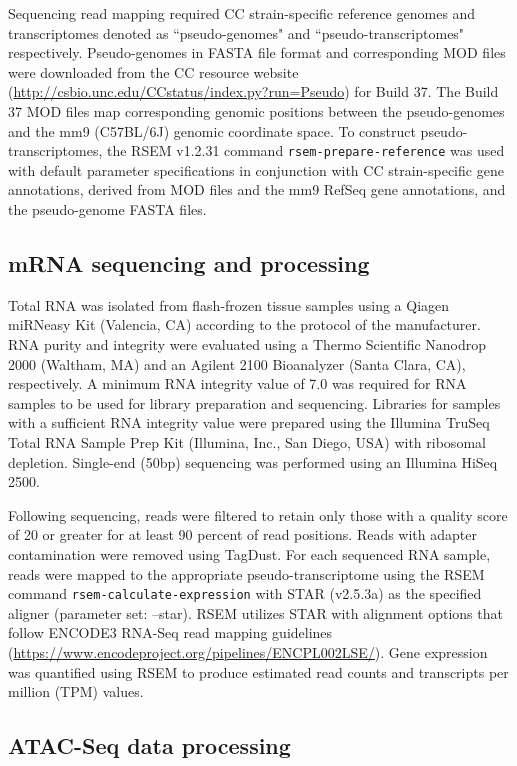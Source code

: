 Sequencing read mapping required CC strain-specific reference genomes and transcriptomes denoted as ``pseudo-genomes" and ``pseudo-transcriptomes" respectively. Pseudo-genomes in FASTA file format and corresponding MOD files were downloaded from the CC resource website (\url{http://csbio.unc.edu/CCstatus/index.py?run=Pseudo}) for Build 37. The Build 37 MOD files map corresponding genomic positions between the pseudo-genomes and the mm9 (C57BL/6J) genomic coordinate space. To construct pseudo-transcriptomes, the RSEM v1.2.31 command \texttt{rsem-prepare-reference} was used with default parameter specifications in conjunction with CC strain-specific gene annotations, derived from MOD files and the mm9 RefSeq gene annotations, and the pseudo-genome FASTA files.

\subsection{mRNA sequencing and processing}

Total RNA was isolated from flash-frozen tissue samples using a Qiagen miRNeasy Kit (Valencia, CA) according to the protocol of the manufacturer. RNA purity and integrity were evaluated using a Thermo Scientific Nanodrop 2000 (Waltham, MA) and an Agilent 2100 Bioanalyzer (Santa Clara, CA), respectively. A minimum RNA integrity value of 7.0 was required for RNA samples to be used for library preparation and sequencing. Libraries for samples with a sufficient RNA integrity value were prepared using the Illumina TruSeq Total RNA Sample Prep Kit (Illumina, Inc., San Diego, USA) with ribosomal depletion. Single-end (50bp) sequencing was performed using an Illumina HiSeq 2500.

Following sequencing, reads were filtered to retain only those with a quality score of 20 or greater for at least 90 percent of read positions. Reads with adapter contamination were removed using TagDust. For each sequenced RNA sample, reads were mapped to the appropriate pseudo-transcriptome using the RSEM command \texttt{rsem-calculate-expression} with STAR (v2.5.3a) as the specified aligner (parameter set: --star). RSEM utilizes STAR with alignment options that follow ENCODE3 RNA-Seq read mapping guidelines (\url{https://www.encodeproject.org/pipelines/ENCPL002LSE/}). Gene expression was quantified using RSEM to produce estimated read counts and transcripts per million (TPM) values.

\subsection{ATAC-Seq data processing}

